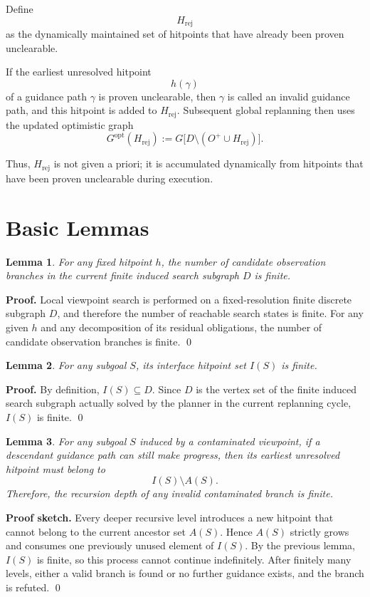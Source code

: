 \documentclass[11pt]{article}
\newtheorem{lemma}{Lemma}
\begin{document}
Define
\[
H_{\mathrm{rej}}
\]
as the dynamically maintained set of hitpoints that have already been proven unclearable.

If the earliest unresolved hitpoint
\[
h(\gamma)
\]
of a guidance path $\gamma$ is proven unclearable, then $\gamma$ is called an invalid guidance path, and this hitpoint is added to $H_{\mathrm{rej}}$. Subsequent global replanning then uses the updated optimistic graph
\[
G^{\mathrm{opt}}(H_{\mathrm{rej}})
:= G\big[D\setminus (O^{+}\cup H_{\mathrm{rej}})\big].
\]

Thus, $H_{\mathrm{rej}}$ is not given a priori; it is accumulated dynamically from hitpoints that have been proven unclearable during execution.

\section{Basic Lemmas}

\begin{lemma}
For any fixed hitpoint $h$, the number of candidate observation branches in the current finite induced search subgraph $D$ is finite.
\end{lemma}

\noindent\textbf{Proof.}
Local viewpoint search is performed on a fixed-resolution finite discrete subgraph $D$, and therefore the number of reachable search states is finite. For any given $h$ and any decomposition of its residual obligations, the number of candidate observation branches is finite. \qed

\begin{lemma}
For any subgoal $S$, its interface hitpoint set $I(S)$ is finite.
\end{lemma}

\noindent\textbf{Proof.}
By definition, $I(S)\subseteq D$. Since $D$ is the vertex set of the finite induced search subgraph actually solved by the planner in the current replanning cycle, $I(S)$ is finite. \qed

\begin{lemma}
For any subgoal $S$ induced by a contaminated viewpoint, if a descendant guidance path can still make progress, then its earliest unresolved hitpoint must belong to
\[
I(S)\setminus A(S).
\]
Therefore, the recursion depth of any invalid contaminated branch is finite.
\end{lemma}

\noindent\textbf{Proof sketch.}
Every deeper recursive level introduces a new hitpoint that cannot belong to the current ancestor set $A(S)$. Hence $A(S)$ strictly grows and consumes one previously unused element of $I(S)$. By the previous lemma, $I(S)$ is finite, so this process cannot continue indefinitely. After finitely many levels, either a valid branch is found or no further guidance exists, and the branch is refuted. \qed
\end{document}
